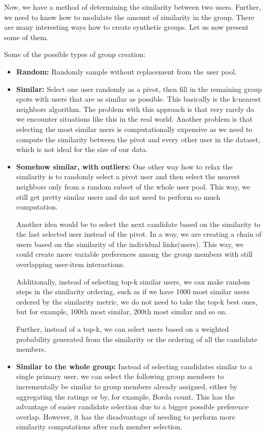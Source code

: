 Now, we have a method of determining the similarity between two users. Further, we need to know how to modulate the amount of similarity in the group. There are many interesting ways how to create synthetic groups. Let us now present some of them.

Some of the possible types of group creation:
\begin{itemize}
    \item \textbf{Random:}
        Randomly sample without replacement from the user pool.
        
    \item \textbf{Similar:}
        Select one user randomly as a pivot, then fill in the remaining group spots with users that are as similar as possible. This basically is the k-nearest neighbors algorithm. The problem with this approach is that very rarely do we encounter situations like this in the real world. Another problem is that selecting the most similar users is computationally expensive as we need to compute the similarity between the pivot and every other user in the dataset, which is not ideal for the size of our data.
        
    \item \textbf{Somehow similar, with outliers:}
        One other way how to relax the similarity is to randomly select a pivot user and then select the nearest neighbors only from a random subset of the whole user pool. This way, we still get pretty similar users and do not need to perform so much computation.
        
        Another idea would be to select the next candidate based on the similarity to the last selected user instead of the pivot. In a way, we are creating a chain of users based on the similarity of the individual links(users). This way, we could create more variable preferences among the group members with still overlapping user-item interactions.
        
        Additionally, instead of selecting top-k similar users, we can make random steps in the similarity ordering, such as if we have 1000 most similar users ordered by the similarity metric, we do not need to take the top-k best ones, but for example, 100th most similar, 200th most similar and so on.
        
        Further, instead of a top-k, we can select users based on a weighted probability generated from the similarity or the ordering of all the candidate members.
        
    \item \textbf{Similar to the whole group:}
        Instead of selecting candidates similar to a single primary user, we can select the following group members to incrementally be similar to group members already assigned, either by aggregating the ratings or by, for example, Borda count. This has the advantage of easier candidate selection due to a bigger possible preference overlap. However, it has the disadvantage of needing to perform more similarity computations after each member selection.
        

\end{itemize}
